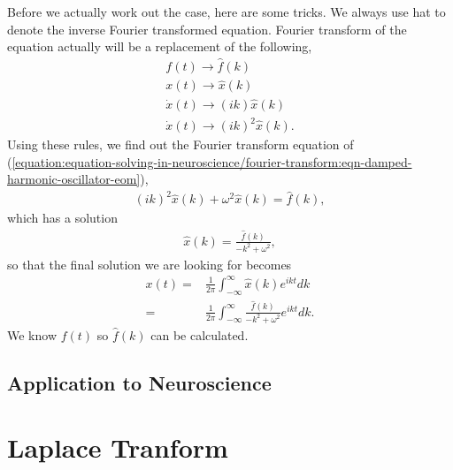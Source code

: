 \documentclass[letterpaper,10pt,english]{sphinxmanual}
\begin{document}
Before we actually work out the case, here are some tricks. We always use hat to denote the inverse Fourier transformed equation. Fourier transform of the equation actually will be a replacement of the following,
\begin{equation*}
\begin{split}f(t)\to \hat f(k) \\
x(t)\to \hat x(k) \\
\dot x(t) \to (ik )\hat x(k) \\
\dot x(t) \to (ik )^2\hat x(k).\end{split}
\end{equation*}
Using these rules, we find out the Fourier transform equation of (\eqref{equation:equation-solving-in-neuroscience/fourier-transform:eqn-damped-harmonic-oscillator-eom}),
\begin{equation*}
\begin{split}(ik )^2 \hat x(k) + \omega^2  \hat x(k) = \hat f(k),\end{split}
\end{equation*}
which has a solution
\begin{equation*}
\begin{split}\hat x(k) = \frac{ \hat f(k) }{ -k^2 + \omega^2 },\end{split}
\end{equation*}
so that the final solution we are looking for becomes
\begin{equation*}
\begin{split}x(t) =& \frac{1}{2\pi}\int_{-\infty}^\infty \hat x(k) e^{i k t} dk \\
=& \frac{1}{2\pi}\int_{-\infty}^\infty  \frac{ \hat f(k) }{ -k^2 + \omega^2 } e^{i k t} dk.\end{split}
\end{equation*}
We know \(f(t)\) so \(\hat f(k)\) can be calculated.


\subsection{Application to Neuroscience}
\label{\detokenize{equation-solving-in-neuroscience/fourier-transform:application-to-neuroscience}}

\section{Laplace Tranform}
\label{\detokenize{equation-solving-in-neuroscience/laplace-transform::doc}}\label{\detokenize{equation-solving-in-neuroscience/laplace-transform:laplace-tranform}}
\end{document}
